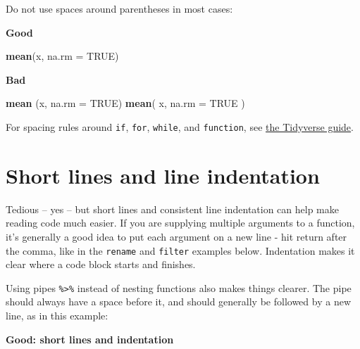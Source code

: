 \documentclass[]{book}
\newenvironment{Shaded}{\begin{snugshade}}{\end{snugshade}}
\newcommand{\DataTypeTok}[1]{\textcolor[rgb]{0.13,0.29,0.53}{#1}}
\newcommand{\KeywordTok}[1]{\textcolor[rgb]{0.13,0.29,0.53}{\textbf{#1}}}
\newcommand{\NormalTok}[1]{#1}
\newcommand{\OtherTok}[1]{\textcolor[rgb]{0.56,0.35,0.01}{#1}}
\begin{document}
Do not use spaces around parentheses in most cases:

\textbf{Good}

\begin{Shaded}
\begin{Highlighting}[]
\KeywordTok{mean}\NormalTok{(x, }\DataTypeTok{na.rm =} \OtherTok{TRUE}\NormalTok{)}
\end{Highlighting}
\end{Shaded}

\textbf{Bad}

\begin{Shaded}
\begin{Highlighting}[]
\KeywordTok{mean}\NormalTok{ (x, }\DataTypeTok{na.rm =} \OtherTok{TRUE}\NormalTok{)}
\KeywordTok{mean}\NormalTok{( x, }\DataTypeTok{na.rm =} \OtherTok{TRUE}\NormalTok{ )}
\end{Highlighting}
\end{Shaded}

For spacing rules around \texttt{if}, \texttt{for}, \texttt{while}, and \texttt{function}, see \href{https://style.tidyverse.org/syntax.html\#parentheses}{the Tidyverse guide}.

\hypertarget{short-lines-and-line-indentation}{%
\section{Short lines and line indentation}\label{short-lines-and-line-indentation}}

Tedious -- yes -- but short lines and consistent line indentation can help make reading code much easier. If you are supplying multiple arguments to a function, it's generally a good idea to put each argument on a new line - hit return after the comma, like in the \texttt{rename} and \texttt{filter} examples below. Indentation makes it clear where a code block starts and finishes.

Using pipes \texttt{\%\textgreater{}\%} instead of nesting functions also makes things clearer. The pipe should always have a space before it, and should generally be followed by a new line, as in this example:

\textbf{Good: short lines and indentation}
\end{document}
